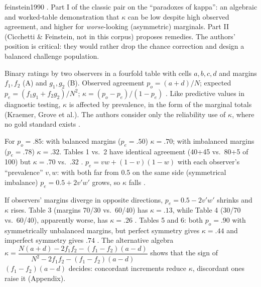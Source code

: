 \begin{papercard}{feinstein1990}
 . Part I of the classic pair on the ``paradoxes of kappa'': an algebraic and worked-table demonstration that $\kappa$ can be low despite high observed agreement, and higher for \emph{worse}-looking (asymmetric) marginals. Part II (Cicchetti \& Feinstein, not in this corpus) proposes remedies. The authors' position is critical: they would rather drop the chance correction and design a balanced challenge population.

 Binary ratings by two observers in a fourfold table with cells $a,b,c,d$ and margins $f_1,f_2$ (A) and $g_1,g_2$ (B). Observed agreement $p_o=(a+d)/N$; expected $p_e=(f_1g_1+f_2g_2)/N^2$; $\kappa=(p_o-p_e)/(1-p_e)$ . Like predictive values in diagnostic testing, $\kappa$ is affected by prevalence, in the form of the marginal totals (Kraemer, Grove et al.). The authors consider only the reliability use of $\kappa$, where no gold standard exists .

 For $p_o=.85$: with balanced margins ($p_e=.50$) $\kappa=.70$; with imbalanced margins ($p_e=.78$) $\kappa=.32$. Tables 1 vs.\ 2 have identical agreement (40+45 vs.\ 80+5 of 100) but $\kappa=.70$ vs.\ $.32$ . $p_e=vw+(1-v)(1-w)$ with each observer's ``prevalence'' $v,w$: with both far from 0.5 on the same side (symmetrical imbalance) $p_e=0.5+2v'w'$ grows, so $\kappa$ falls .

 If observers' margins diverge in opposite directions, $p_e=0.5-2v'w'$ shrinks and $\kappa$ rises. Table 3 (margins 70/30 vs.\ 60/40) has $\kappa=.13$, while Table 4 (30/70 vs.\ 60/40), apparently worse, has $\kappa=.26$ . Tables 5 and 6: both $p_o=.90$ with symmetrically unbalanced margins, but perfect symmetry gives $\kappa=.44$ and imperfect symmetry gives $.74$ . The alternative algebra $\kappa=\dfrac{N(a+d)-2f_1f_2-(f_1-f_2)(a-d)}{N^2-2f_1f_2-(f_1-f_2)(a-d)}$ shows that the sign of $(f_1-f_2)(a-d)$ decides: concordant increments reduce $\kappa$, discordant ones raise it (Appendix).


\end{papercard}
